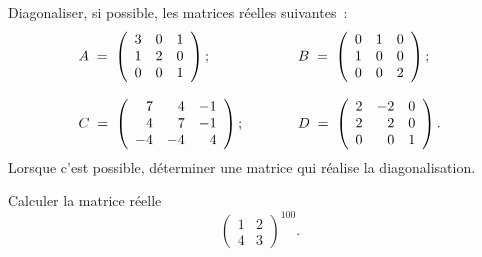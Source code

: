 \documentclass[12pt,french,oneside,a4paper]{memoir} %
\begin{document}
\begin{exo}
Diagonaliser, si possible, les matrices réelles suivantes~:
\begin{equation*}
\begin{array}{l@{\qquad\qquad}l}
A\;=\; \left( \begin{array}{rrr}
3 &0 &1 \\
1 &2 &0 \\
0 &0 &1 \end{array} \right); \quad 
&B\;=\; \left( \begin{array}{rrr}
0 &1 &0 \\
1 &0 &0 \\
0 &0 &2 \end{array} \right); \\
& \\
C\;=\; \left( \begin{array}{rrr}
7 &4 &-1 \\
4 &7 &-1 \\
-4 &-4 &4 \end{array} \right);
&D\;=\; \left( \begin{array}{rrr}
2 &-2 &0 \\
2 &2 &0 \\
0 &0 &1 \end{array} \right).
\end{array} 
\end{equation*}
Lorsque c'est possible, déterminer une matrice qui réalise la diagonalisation.
\end{exo}

\begin{exo}
Calculer la matrice réelle
\begin{equation*}
\left( \begin{array}{rr}
1 &2 \\
4 &3 \end{array} \right)^{100}.
\end{equation*}
\end{exo}
\end{document}

